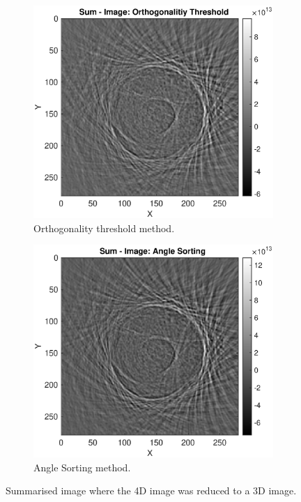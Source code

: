 \begin{figure}[H]
     \centering
     \begin{subfigure}[b]{0.49\textwidth}
         \centering
         \includegraphics[width=1.12\linewidth]{Graphics/Results/Diff_angle_sort_orthogonality/diff_ortho_bubble_sumImmage_ortho.eps}
         \caption{Orthogonality threshold method.}
         \label{fig:res:summareized_bubble_ortho_image_ortho}
     \end{subfigure}
     \hfill
     \begin{subfigure}[b]{0.49\textwidth}
         \centering
         \includegraphics[width=1.12\textwidth]{Graphics/Results/Diff_angle_sort_orthogonality/diff_ortho_bubble_sumImmage_sort.eps}
         \caption{Angle Sorting method.}
         \label{fig:res:summareized_bubble_ortho_image_bubble}
     \end{subfigure}
        \caption{Summarised image where the 4D image was reduced to a 3D image. }
        \label{fig:res:summareized_bubble_ortho_image}
\end{figure}

